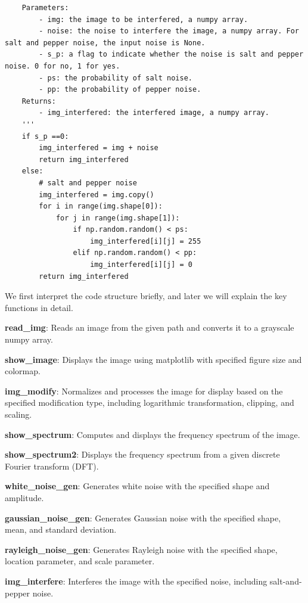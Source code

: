 \documentclass[UTF8]{ctexart}
\begin{document}
\begin{lstlisting}
    Parameters:
        - img: the image to be interfered, a numpy array.
        - noise: the noise to interfere the image, a numpy array. For salt and pepper noise, the input noise is None.
        - s_p: a flag to indicate whether the noise is salt and pepper noise. 0 for no, 1 for yes.
        - ps: the probability of salt noise.
        - pp: the probability of pepper noise.
    Returns:
        - img_interfered: the interfered image, a numpy array.
    '''
    if s_p ==0:
        img_interfered = img + noise
        return img_interfered
    else:
        # salt and pepper noise
        img_interfered = img.copy()
        for i in range(img.shape[0]):
            for j in range(img.shape[1]):
                if np.random.random() < ps:
                    img_interfered[i][j] = 255
                elif np.random.random() < pp:
                    img_interfered[i][j] = 0
        return img_interfered
\end{lstlisting}
We first interpret the code structure briefly, and later we will explain the key functions in detail.

\textbf{read\_img}: Reads an image from the given path and converts it to a grayscale numpy array.

\textbf{show\_image}: Displays the image using matplotlib with specified figure size and colormap.

\textbf{img\_modify}: Normalizes and processes the image for display based on the specified modification type, including logarithmic transformation, clipping, and scaling.

\textbf{show\_spectrum}: Computes and displays the frequency spectrum of the image.

\textbf{show\_spectrum2}: Displays the frequency spectrum from a given discrete Fourier transform (DFT).

\textbf{white\_noise\_gen}: Generates white noise with the specified shape and amplitude.

\textbf{gaussian\_noise\_gen}: Generates Gaussian noise with the specified shape, mean, and standard deviation.

\textbf{rayleigh\_noise\_gen}: Generates Rayleigh noise with the specified shape, location parameter, and scale parameter.

\textbf{img\_interfere}: Interferes the image with the specified noise, including salt-and-pepper noise.
\end{document}

